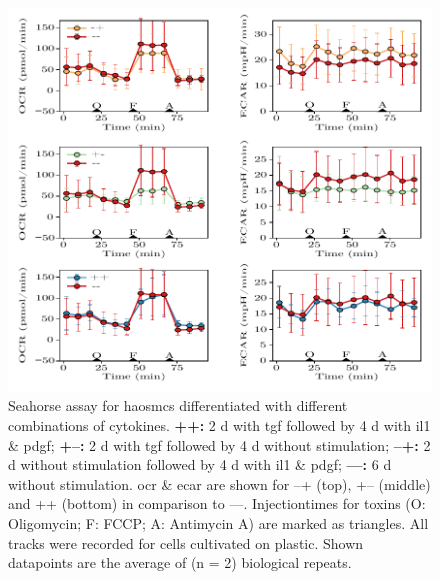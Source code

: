     \begin{figure}[h!]
    \capstart
        \centering
        \includegraphics{Abbildung/Seahorse_tracks.pdf}

        \begin{minipage}{\captionwidth}
            \caption[seahorse_tracks]{ \newline Seahorse assay for \acp{haosmc} differentiated with different combinations of cytokines.
            \textbf{++:} 2 d with \ac{tgf} followed by 4 d with \ac{il1} \& \ac{pdgf};
            \textbf{+–:} 2 d with \ac{tgf} followed by 4 d without stimulation;
            \textbf{–+:} 2 d without stimulation followed by 4 d with \ac{il1} \& \ac{pdgf};
            \textbf{––:} 6 d without stimulation.
            \ac{ocr} \& \ac{ecar} are shown for –+ (top), +– (middle) and ++ (bottom) in comparison to ––. Injectiontimes for toxins (O: Oligomycin; F: FCCP; A: Antimycin A) are marked as triangles. All tracks were recorded for cells cultivated on plastic. Shown datapoints are the average of (n = 2) biological repeats.
            }
            \label{fig:seahorse_tracks}
        \end{minipage}
    \end{figure}

